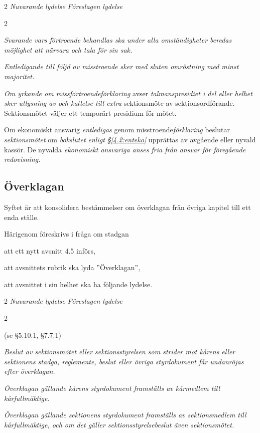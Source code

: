\documentclass{article}
\newenvironment{lydelse}
    {\begin{paracol}{2}%
        \emph{Nuvarande lydelse}%
        \switchcolumn%
        \emph{Föreslagen lydelse}%
    \end{paracol}%
    \begin{enumerate}[label=\thesubsection.\arabic*]%
    \begin{paracol}{2}%
    }{\end{paracol}\end{enumerate}}
\begin{document}
\begin{lydelse}
    \item \emph{Svarande vars förtroende behandlas ska under alla omständigheter beredas möjlighet att närvara och tala för sin sak.}

    \item \emph{Entledigande till följd av misstroende sker med sluten omröstning med minst  majoritet.}  
     
    \item \emph{Om yrkande om missförtroendeförklaring} avser \emph{talmanspresidiet i del eller helhet sker utlysning av och kallelse till extra} sektionsmöte av sektionsordförande.
      Sektionsmötet väljer ett temporärt presidium för mötet.
    
    \item Om ekonomiskt ansvarig \emph{entledigas} genom misstroende\emph{förklaring} beslutar \emph{sektionsmötet} om \emph{bokslutet enligt \S\ref{4.2:enteko}} upprättas av avgående eller nyvald kassör. De nyvalda \emph{ekonomiskt ansvariga anses fria från ansvar för föregående redovisning.}
\end{lydelse}
\setcounter{subsection}{4}    

\subsection{Överklagan}
Syftet är att konsolidera bestämmelser om överklagan från övriga kapitel till ett enda ställe.

Härigenom föreskrivs i fråga om stadgan
\begin{dels}
  \item att ett nytt avsnitt 4.5 införs,
  \item att avsnittets rubrik ska lyda ''Överklagan'',
  \item att avsnittet i sin helhet ska ha följande lydelse.
\end{dels}

\begin{lydelse}
  \item[] (se \S 5.10.1, \S 7.7.1)
  
  \switchcolumn
  \item \emph{Beslut av sektionsmötet eller sektionsstyrelsen som strider mot kårens eller sektionens stadga, reglemente, beslut eller övriga styrdokument får undanröjas efter överklagan.}
  \item \emph{Överklagan gällande kårens styrdokument framställs av kårmedlem till kårfullmäktige.}
  \item \emph{Överklagan gällande sektionens styrdokument framställs av sektionsmedlem till kårfullmäktige, och om det gäller sektionsstyrelsebeslut även sektionsmötet.}
\end{lydelse}
\end{document}

